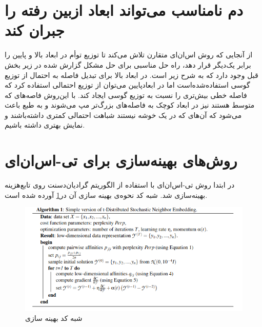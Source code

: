 \section{دم نامناسب می‌تواند ابعاد ازبین رفته را جبران کند}
از آنجایی که روش اس‌ان‌ای متقارن تلاش می‌کند تا توزیع توأم در ابعاد بالا و پایین را برابر یک‌دیگر قرار دهد، راه حل مناسبی برای حل مشکل گزارش شده در زیر بخش قبل وجود دارد که به شرح زیر است.
در ابعاد بالا برای تبدیل فاصله به احتمال از توزیع گوسی استفاده‌شده‌است اما در ابعاد‌پایین می‌توان از توزیع احتمالی استفاده کرد که فاصله خطی بیش‌تری را نسبت به توزیع گوسی ایجاد کند. با این‌روش فاصه‌های که متوسط هستند نیز در ابعاد کوچک به فاصله‌های بزرگ‌تر مپ می‌شوند و به طبع باعث می‌شود که آن‌های که در یک خوشه نیستند شباهت احتمالی کمتری داشته‌باشند و نمایش بهتری داشته باشیم.

\section{روش‌های بهینه‌سازی برای تی-اس‌ان‌ای}
در ابتدا روش تی-‌اس‌ان‌ای با استفاده از الگوریتم گرادیان‌دسنت روی تابع‌هزینه بهینه‌سازی شد. شبه کد نحوه‌ی بهینه سازی آن در\cref{algfig1} آورده شده است.
\\
\begin{figure}
	\centering\includegraphics[scale=.6]{algfig1.png}
	\caption{شبه کد بهینه سازی }\label{algfig1}
\end{figure}

